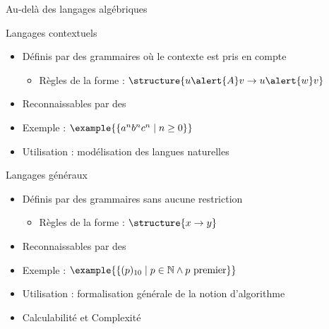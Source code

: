 
\begingroup

\begin{frame}{Au-delà des langages algébriques}

  \begin{block}{Langages contextuels}
    \begin{itemize}
      \item Définis par des grammaires où le contexte est pris en compte
        \begin{itemize}
        \item Règles de la forme : $\structure{u \alert{A} v \rightarrow u \alert{w} v}$
        \end{itemize}
      \item Reconnaissables par des 
      \item Exemple : $\example{\{ a^n b^n c^n \mid n \geq 0 \}}$
      \item Utilisation : modélisation des langues naturelles
    \end{itemize}
  \end{block}

  \begin{block}{Langages généraux}
    \begin{itemize}
      \item Définis par des grammaires sans aucune restriction
        \begin{itemize}
        \item Règles de la forme : $\structure{x \rightarrow y}$
        \end{itemize}
      \item Reconnaissables par des 
      \item Exemple : $\example{\left\{ (p)_{10} \mid p\in \mathbb{N} \land p \text{ premier} \right\}}$
      \item Utilisation : formalisation générale de la notion d’algorithme
      \item {} \alert{Calculabilité et Complexité}
    \end{itemize}
  \end{block}

\end{frame}

\endgroup
\endinput
